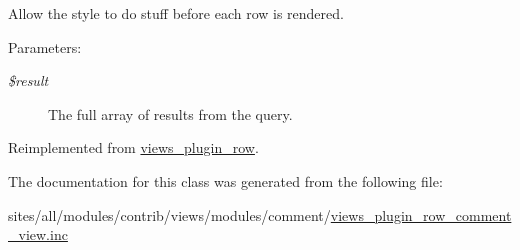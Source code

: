 Allow the style to do stuff before each row is rendered.

\begin{Desc}
\item[Parameters:]
\begin{description}
\item[{\em \$result}]The full array of results from the query. \end{description}
\end{Desc}


Reimplemented from \hyperlink{classviews__plugin__row_e49a23f750874e4b3d294aa3a20ecd64}{views\_\-plugin\_\-row}.

The documentation for this class was generated from the following file:\begin{CompactItemize}
\item 
sites/all/modules/contrib/views/modules/comment/\hyperlink{views__plugin__row__comment__view_8inc}{views\_\-plugin\_\-row\_\-comment\_\-view.inc}\end{CompactItemize}
